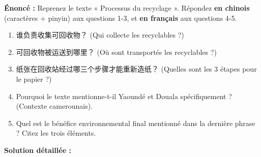 \documentclass[11pt]{article}
\begin{document}
\begin{exoresolu}
\textbf{Énoncé :} Reprenez le texte « Processus du recyclage ». Répondez \textbf{en chinois} (caractères + pinyin) aux questions 1-3, et \textbf{en français} aux questions 4-5.

\begin{enumerate}
    \item 谁负责收集可回收物？ (Qui collecte les recyclables ?)
    \item 可回收物被运送到哪里？ (Où sont transportés les recyclables ?)
    \item 纸张在回收站经过哪三个步骤才能重新造纸？ (Quelles sont les 3 étapes pour le papier ?)
    \item Pourquoi le texte mentionne-t-il Yaoundé et Douala spécifiquement ? (Contexte camerounais).
    \item Quel est le bénéfice environnemental final mentionné dans la dernière phrase ? Citez les trois éléments.
\end{enumerate}

\tcblower

\textbf{Solution détaillée :}


\end{exoresolu}
\end{document}
